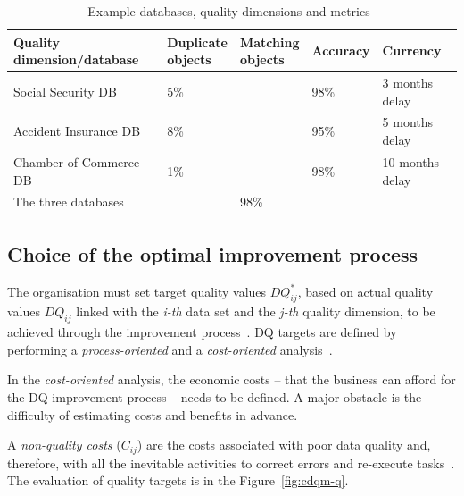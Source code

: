 \begin{table}[htbp]
    \centering

    \begin{tabular}{@{}lllll@{}}
        \toprule
        Quality dimension/database  & \shortstack{Duplicate \\ objects} & \shortstack{Matching \\ objects}  & Accuracy  & Currency          \\ \midrule
        Social Security DB          & 5\%                               &                                   & 98\%      & 3 months delay    \\
        Accident Insurance DB       & 8\%                               &                                   & 95\%      & 5 months delay    \\
        Chamber of Commerce DB      & 1\%                               &                                   & 98\%      & 10 months delay   \\
        The three databases         &                                   & 98\%                              &           &                   \\
        \bottomrule
    \end{tabular}

    \caption{Example databases, quality dimensions and metrics~\cite{batini2008}}
    \label{table:ex-dat}
\end{table}
\FloatBarrier

\subsection{Choice of the optimal improvement process}

The organisation must set target quality values \( DQ_{ij}^* \), based on actual quality values \( DQ_{ij} \) linked with the \textit{i-th} data set and the \textit{j-th} quality dimension, to be achieved through the improvement process~\cite{batini2008}.
DQ targets are defined by performing a \textit{process-oriented} and a \textit{cost-oriented} analysis~\cite{batini2008}.

In the \textit{cost-oriented} analysis, the economic costs – that the business can afford for the DQ improvement process – needs to be defined.
A major obstacle is the difficulty of estimating costs and benefits in advance.

A \textit{non-quality costs} (\( C_{ij} \)) are the costs associated with poor data quality and, therefore, with all the inevitable activities to correct errors and re-execute tasks~\cite{batini2008}.
The evaluation of quality targets is in the Figure~\ref{fig:cdqm-q}.


